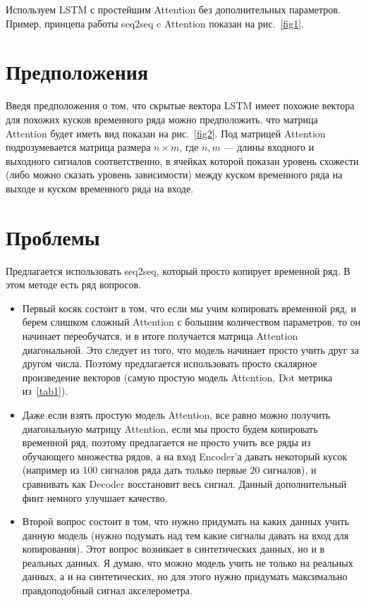 \documentclass[11pt, a4paper]{article}
\begin{document}
Используем LSTM с простейшим Attention без дополнительных параметров. Пример, принцепа работы seq2seq c Attention показан на рис.~\ref{fig1}.

\section{Предположения}
Введя предположения о том, что скрытые вектора LSTM имеет похожие вектора для похожих кусков временного ряда можно предположить, что матрица Attention будет иметь вид показан на рис.~\ref{fig2}. Под матрицей Attention подрозумевается матрица размера $n\times m$, где $n, m$ --- длины входного и выходного сигналов соответственно, в ячейках которой показан уровень схожести (либо можно сказать уровень зависимости) между куском временного ряда на выходе и куском временного ряда на входе.

\section{Проблемы}
Предлагается использовать seq2seq, который просто копирует временной ряд. В этом методе есть ряд вопросов.
\begin{itemize}
    \item Первый косяк состоит в том, что если мы учим копировать временной ряд, и берем слишком сложный Attention с большим количеством параметров, то он начинает переобучатся, и в итоге получается матрица Attention диагональной. Это следует из того, что модель начинает просто учить друг за другом числа. Поэтому предлагается использовать просто скалярное произведение векторов (самую простую модель Attention, Dot метрика из~\ref{tab1}).
    
    \item Даже если взять простую модель Attention, все равно можно получить диагональную матрицу Attention, если мы просто будем копировать временной ряд, поэтому предлагается не просто учить все ряды из обучающего множества рядов, а на вход Encoder'а давать некоторый кусок (например из 100 сигналов ряда дать только первые 20 сигналов), и сравнивать как Decoder восстановит весь сигнал. Данный дополнительный финт немного улучшает качество.
    
    \item Второй вопрос состоит в том, что нужно придумать на каких данных учить данную модель (нужно подумать над тем какие сигналы давать на вход для копирования). Этот вопрос возникает в синтетических данных, но и в реальных данных. Я думаю, что можно модель учить не только на реальных данных, а и на синтетических, но для этого нужно придумать максимально правдоподобный сигнал акселерометра.
    
\end{itemize}
\end{document}
